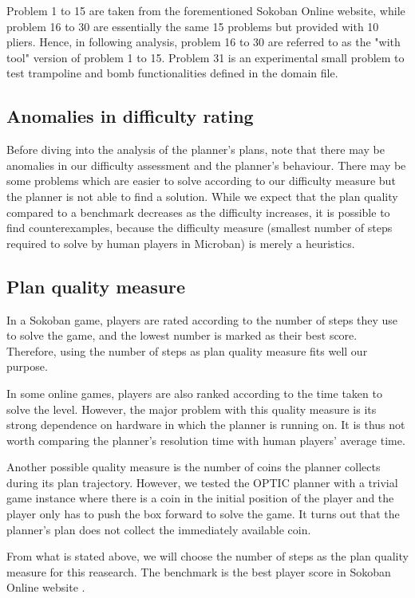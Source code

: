 \documentclass[letterpaper]{article} %
\begin{document}
Problem 1 to 15 are taken from the forementioned Sokoban Online website, while problem 16 
to 30 are essentially the same 15 problems but provided with 10 pliers. Hence, in following
analysis, problem 16 to 30 are referred to as the "with tool" version of problem 1 to 15.
Problem 31 is an experimental small problem to test trampoline and bomb functionalities
defined in the domain file.

\subsection{Anomalies in difficulty rating}
Before diving into the analysis of the planner's plans, note 
that there may be anomalies in our difficulty assessment 
and the planner's behaviour. There may be some problems 
which are easier to solve according to our difficulty measure but 
the planner is not able to find a solution. While we expect
that the plan quality compared to a benchmark decreases as the
difficulty increases, it is possible to find counterexamples, 
because the difficulty measure (smallest
number of steps required to solve by human players in Microban) 
is merely a heuristics. 

\subsection{Plan quality measure}
In a Sokoban game, players are rated according to the number
of steps they use to solve the game, and the lowest number 
is marked as their best score. Therefore, using the number of steps 
as plan quality measure fits well our purpose. 

In some online games, players are also ranked according to 
the time taken to solve the level. However, the major problem
with this quality measure is its strong dependence 
on hardware in which the planner is running on. 
It is thus not worth comparing the planner's resolution time 
with human players' average time. 

Another possible quality measure is the number of coins the 
planner collects during its plan trajectory. However, we tested 
the OPTIC planner with a trivial game instance where there is a 
coin in the initial position of the player and the player only 
has to push the box forward to solve the game. It turns out that
the planner's plan does not collect the immediately available coin. 

From what is stated above, we will choose the number of steps 
as the plan quality measure for this reasearch. 
The benchmark is the best player score in Sokoban Online website \cite{microban}.
\end{document}
